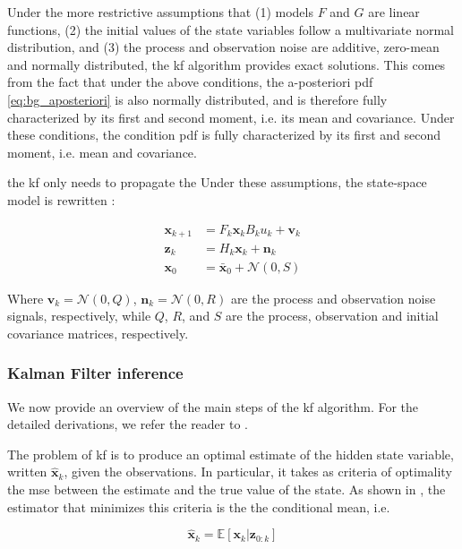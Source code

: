 Under the more restrictive assumptions that (1) models $F$ and $G$ are linear functions, (2) the initial values of the state variables follow a multivariate normal distribution, and (3) the process and observation noise are additive, zero-mean and normally distributed, the \gls{kf} algorithm provides exact solutions.
This comes from the fact that under the above conditions, the a-posteriori pdf \ref{eq:bg_aposteriori} is also normally distributed, and is therefore fully characterized by its first and second moment, i.e. its mean and covariance.
Under these conditions, the condition \gls{pdf} is fully characterized by its first and second moment, i.e. mean and covariance.

the \gls{kf} only needs to propagate the
Under these assumptions, the state-space model is rewritten :

\begin{align}
  \bm{x}_{k+1}&=F_{k}\bm{x}_{k} B_{k}u_{k} + \bm{v}_{k} \label{eq:bg_state_trans_kf}\\
  \bm{z}_{k}&= H_{k}\bm{x}_{k} + \bm{n}_{k} \label{eq:bg_proc_kf} \\
  \bm{x}_{0}&= \bm{\bar{x}}_{0} + \mathcal{N}(0,S) \label{eq:bg_init_kf}
\end{align}

Where $\bm{v}_{k}=\mathcal{N}(0,Q)$, $\bm{n}_{k}=\mathcal{N}(0,R)$ are the process and observation noise signals, respectively, while $Q$, $R$, and $S$ are the process, observation and initial covariance matrices, respectively.

\subsubsection{Kalman Filter inference}
We now provide an overview of the main steps of the \gls{kf} algorithm.
For the detailed derivations, we refer the reader to \cite{thacker98}.

The problem of \gls{kf} is to produce an optimal estimate of the hidden state variable, written $\bm{\hat x}_{k}$, given the observations.
In particular, it takes as criteria of optimality the \gls{mse} between the estimate and the true value of the state.
As shown in \cite{ribeiro04}, the estimator that minimizes this criteria is the the conditional mean, i.e.

\begin{equation}
  \label{eq:bg_cond_mean}
  \bm{\hat x}_{k} = \mathbb{E}[\bm{x}_{k}|\bm{z}_{0:k}]
\end{equation}

